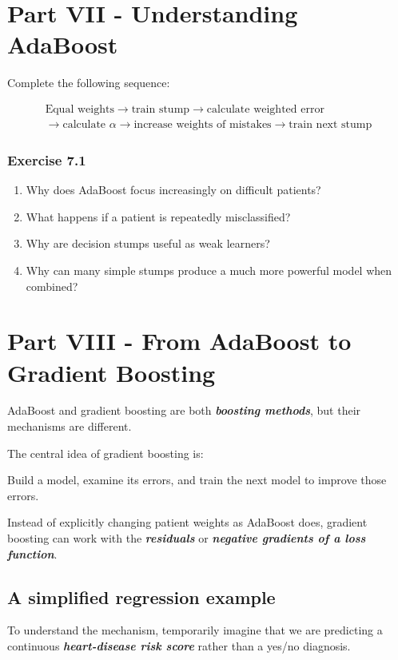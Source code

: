 \documentclass{course_sheet}
\begin{document}
\section*{Part VII - Understanding AdaBoost}
Complete the following sequence:

\[
\begin{gathered}
\text{Equal weights}\rightarrow\text{train stump}\rightarrow\text{calculate weighted error}\\
\rightarrow\text{calculate }\alpha\rightarrow\text{increase weights of mistakes}\rightarrow\text{train next stump}
\end{gathered}
\]

\subsubsection*{Exercise 7.1}
\begin{enumerate}
\item
Why does AdaBoost focus increasingly on difficult patients?

\item
What happens if a patient is repeatedly misclassified?

\item
Why are decision stumps useful as weak learners?

\item
Why can many simple stumps produce a much more powerful model when combined?

\end{enumerate}
\clearpage
\section*{Part VIII - From AdaBoost to Gradient Boosting}
AdaBoost and gradient boosting are both \textbf{\textit{boosting methods}}, but their mechanisms are different.

The central idea of gradient boosting is:

Build a model, examine its errors, and train the next model to improve those errors.

Instead of explicitly changing patient weights as AdaBoost does, gradient boosting can work with the \textbf{\textit{residuals}} or \textbf{\textit{negative gradients of a loss function}}.

\subsection*{A simplified regression example}
To understand the mechanism, temporarily imagine that we are predicting a continuous \textbf{\textit{heart-disease risk score}} rather than a yes/no diagnosis.
\end{document}
